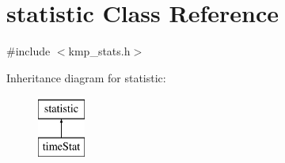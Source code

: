 \hypertarget{classstatistic}{\section{statistic Class Reference}
\label{classstatistic}
}


{\ttfamily \#include $<$kmp\-\_\-stats.\-h$>$}

Inheritance diagram for statistic\-:\begin{figure}[H]
\begin{center}
\leavevmode
\includegraphics[height=2.000000cm]{classstatistic}
\end{center}
\end{figure}
